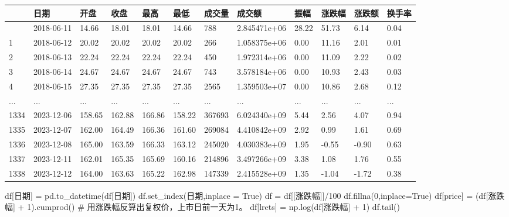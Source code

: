\documentclass[
  letterpaper,
  DIV=11,
  numbers=noendperiod]{scrreprt}
\newenvironment{Shaded}{\begin{snugshade}}{\end{snugshade}}
\newcommand{\CommentTok}[1]{\textcolor[rgb]{0.37,0.37,0.37}{#1}}
\newcommand{\DecValTok}[1]{\textcolor[rgb]{0.68,0.00,0.00}{#1}}
\newcommand{\NormalTok}[1]{\textcolor[rgb]{0.00,0.23,0.31}{#1}}
\newcommand{\OperatorTok}[1]{\textcolor[rgb]{0.37,0.37,0.37}{#1}}
\newcommand{\StringTok}[1]{\textcolor[rgb]{0.13,0.47,0.30}{#1}}
\newcommand{\VariableTok}[1]{\textcolor[rgb]{0.07,0.07,0.07}{#1}}
\begin{document}
\begin{longtable}[]{@{}llllllllllll@{}}
\toprule\noalign{}
& 日期 & 开盘 & 收盘 & 最高 & 最低 & 成交量 & 成交额 & 振幅 & 涨跌幅 &
涨跌额 & 换手率 \\
\midrule\noalign{}
\endhead
\bottomrule\noalign{}
\endlastfoot
0 & 2018-06-11 & 14.66 & 18.01 & 18.01 & 14.66 & 788 & 2.845471e+06 &
28.22 & 51.73 & 6.14 & 0.04 \\
1 & 2018-06-12 & 20.02 & 20.02 & 20.02 & 20.02 & 266 & 1.058375e+06 &
0.00 & 11.16 & 2.01 & 0.01 \\
2 & 2018-06-13 & 22.24 & 22.24 & 22.24 & 22.24 & 450 & 1.972314e+06 &
0.00 & 11.09 & 2.22 & 0.02 \\
3 & 2018-06-14 & 24.67 & 24.67 & 24.67 & 24.67 & 743 & 3.578184e+06 &
0.00 & 10.93 & 2.43 & 0.03 \\
4 & 2018-06-15 & 27.35 & 27.35 & 27.35 & 27.35 & 2565 & 1.359503e+07 &
0.00 & 10.86 & 2.68 & 0.12 \\
... & ... & ... & ... & ... & ... & ... & ... & ... & ... & ... & ... \\
1334 & 2023-12-06 & 158.65 & 162.88 & 166.86 & 158.22 & 367693 &
6.024340e+09 & 5.44 & 2.56 & 4.07 & 0.94 \\
1335 & 2023-12-07 & 162.00 & 164.49 & 166.36 & 161.60 & 269084 &
4.410842e+09 & 2.92 & 0.99 & 1.61 & 0.69 \\
1336 & 2023-12-08 & 165.00 & 163.59 & 166.33 & 163.12 & 245020 &
4.030383e+09 & 1.95 & -0.55 & -0.90 & 0.63 \\
1337 & 2023-12-11 & 162.01 & 165.35 & 165.69 & 160.16 & 214896 &
3.497266e+09 & 3.38 & 1.08 & 1.76 & 0.55 \\
1338 & 2023-12-12 & 164.00 & 163.63 & 165.22 & 162.98 & 147339 &
2.415528e+09 & 1.35 & -1.04 & -1.72 & 0.38 \\
\end{longtable}

\begin{Shaded}
\begin{Highlighting}[]
\NormalTok{df[}\StringTok{\textquotesingle{}日期\textquotesingle{}}\NormalTok{] }\OperatorTok{=}\NormalTok{ pd.to\_datetime(df[}\StringTok{\textquotesingle{}日期\textquotesingle{}}\NormalTok{])}
\NormalTok{df.set\_index(}\StringTok{\textquotesingle{}日期\textquotesingle{}}\NormalTok{,inplace }\OperatorTok{=} \VariableTok{True}\NormalTok{)}
\NormalTok{df }\OperatorTok{=}\NormalTok{ df[[}\StringTok{\textquotesingle{}涨跌幅\textquotesingle{}}\NormalTok{]]}\OperatorTok{/}\DecValTok{100}
\NormalTok{df.fillna(}\DecValTok{0}\NormalTok{,inplace}\OperatorTok{=}\VariableTok{True}\NormalTok{)}
\NormalTok{df[}\StringTok{\textquotesingle{}price\textquotesingle{}}\NormalTok{] }\OperatorTok{=}\NormalTok{ (df[}\StringTok{\textquotesingle{}涨跌幅\textquotesingle{}}\NormalTok{] }\OperatorTok{+} \DecValTok{1}\NormalTok{).cumprod() }\CommentTok{\# 用涨跌幅反算出复权价，上市日前一天为1。}
\NormalTok{df[}\StringTok{\textquotesingle{}lrets\textquotesingle{}}\NormalTok{] }\OperatorTok{=}\NormalTok{ np.log(df[}\StringTok{\textquotesingle{}涨跌幅\textquotesingle{}}\NormalTok{] }\OperatorTok{+} \DecValTok{1}\NormalTok{)}
\NormalTok{df.tail()}
\end{Highlighting}
\end{Shaded}
\end{document}
